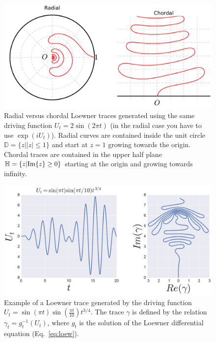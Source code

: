 \begin{figure}
\begin{center}
    \includegraphics[scale=0.4]{chapters/ch4-sle/figs/radchord}
\end{center}
\caption{Radial versus chordal Loewner traces generated using the same driving
    function $U_t=2\sin(2\pi t)$ (in the radial case you have to use
    $\exp(iU_t)$). Radial curves are contained inside the unit circle
    $\mathbb{D}=\{z||z|\leq1\}$ and start at $z=1$ growing towards the origin.
    Chordal traces are contained in the upper half plane
    $\mathbb{H}=\{z|\mbox{Im}\{z\}\geq0\}$ starting at the origin and growing towards
    infinity.}
\label{fig:radchord}
\end{figure}

\begin{figure}
\begin{center}
    \includegraphics[width=\textwidth]{chapters/ch4-sle/figs/leexample}
\end{center}
\caption{Example of a Loewner trace generated by the driving function
    $U_t=\sin(\pi t)\sin(\frac{\pi t}{10})t^{3/4}$. The trace $\gamma$ is
    defined by the relation $\gamma_t = g_t^{-1}(U_t)$, where $g_t$ is the
    solution of the Loewner differential equation (Eq.~\ref{eq:loew}).}
\label{fig:leexample}
\end{figure}

